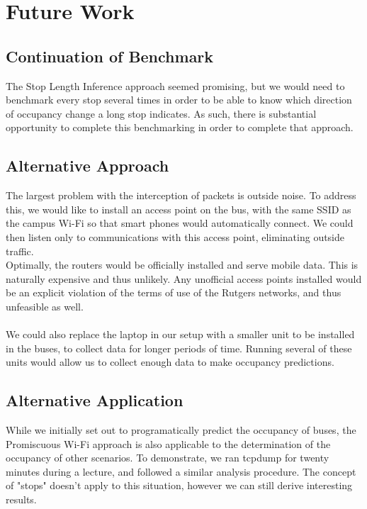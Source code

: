 \documentclass[letterpaper,abstract=on,titlepage=false]{scrreprt}
\begin{document}
\section*{Future Work}
    
    \subsection*{Continuation of Benchmark}
	The Stop Length Inference approach seemed promising, but we would need to benchmark every stop several times in order to be able to know which direction of occupancy change a long stop indicates.
    As such, there is substantial opportunity to complete this benchmarking in order to complete that approach.

    \subsection*{Alternative Approach}
	The largest problem with the interception of packets is outside noise.
	To address this, we would like to install an access point on the bus, with the same SSID as the campus Wi-Fi so that smart phones would automatically connect.
	We could then listen only to communications with this access point, eliminating outside traffic.
	\\
	Optimally, the routers would be officially installed and serve mobile data.
	This is naturally expensive and thus unlikely.
	Any unofficial access points installed would be an explicit violation of the terms of use of the Rutgers networks, and thus unfeasible as well.
	\\\\
	We could also replace the laptop in our setup with a smaller unit to be installed in the buses, to collect data for longer periods of time.
	Running several of these units would allow us to collect enough data to make occupancy predictions.

    \subsection*{Alternative Application}
	While we initially set out to programatically predict the occupancy of buses, the Promiscuous Wi-Fi approach is also applicable to the determination of the occupancy of other scenarios.
	To demonstrate, we ran tcpdump for twenty minutes during a lecture, and followed a similar analysis procedure.
	The concept of "stops" doesn't apply to this situation, however we can still derive interesting results.
\end{document}
